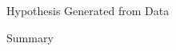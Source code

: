 \documentclass{beamer}
\begin{document}
\begin{frame}{Hypothesis Generated from Data}
%
%
\end{frame}
\begin{frame}{Summary}

\end{frame}
\begin{frame}
\printbibliography

\end{frame}
\end{document}
